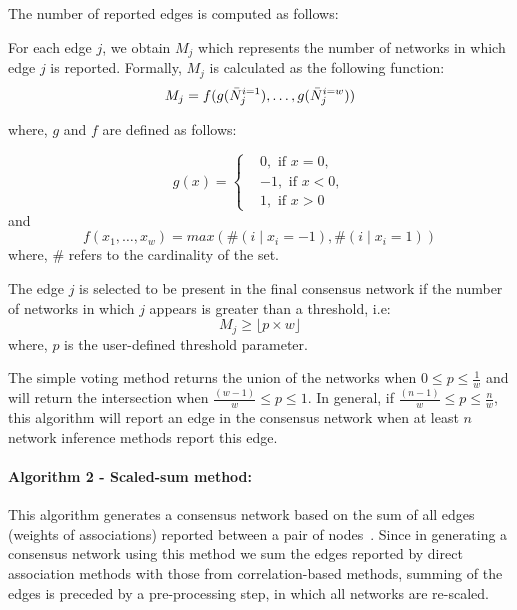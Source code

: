  The number of reported edges is computed as follows:

 For each edge $j$, we obtain $M_j$ which represents the number of networks in which edge $j$ is reported.
 Formally, $M_j$ is calculated as the following function:
  \begin{equation}
      M_j = f(g(\bar{N}^{i=1}_j), \dots, g(\bar{N}^{i=w}_j)) \\
    \label{eq:simple-voting}
  \end{equation}

where, $g$ and $f$ are defined as follows:

  \begin{equation*}
    g(x) =
    \begin{cases}
       & 0, \text{ if } x=0, \\
       & -1, \text{ if } x<0, \\
       & 1, \text{ if } x>0
    \end{cases}
  \end{equation*}
  and
  \begin{equation*}
    f(x_1,\dots,x_w) = max \left( \#(i \mid x_i=-1),\#(i \mid x_i=1)
       \right)
  \end{equation*}
  where, $\#$ refers to the cardinality of the set.

 The edge $j$ is selected to be present in the final consensus network if the number of networks in which $j$ appears is greater than a threshold, i.e:
  \begin{equation}
     M_j \geq \lfloor p \times w \rfloor
    \label{eqn:simple-voting2}
  \end{equation}
  where, $p$ is the user-defined threshold parameter.

  The simple voting method returns the union of the networks when $0 \leq p \leq \frac{1}{w}$ and will return the intersection when $\frac{(w - 1)}{w} \leq p \leq 1$.
  In general, if $\frac{(n - 1)}{w} \leq p \leq \frac{n}{w}$, this algorithm will report an edge in the consensus network when at least $n$ network inference methods report this edge.


  \paragraph*{Algorithm 2 - Scaled-sum method:}

  This algorithm generates a consensus network based on the sum of all edges (weights of associations) reported between a pair of nodes~\cite{bustinceFuzzySetsTheir2008,tsarevApplicationMajorityVoting2018}.
  Since in generating a consensus network using this method we sum the edges reported by direct association methods with those from correlation-based methods, summing of the edges is preceded by a pre-processing step, in which all networks are re-scaled.

